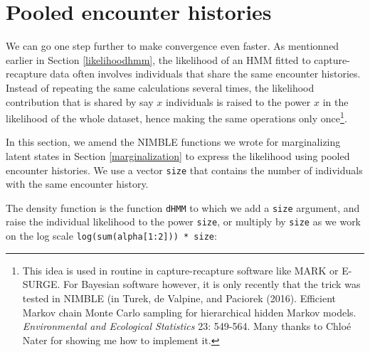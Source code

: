 \documentclass[
  12pt,
]{krantz}
\begin{document}
\hypertarget{pooled-likelihood}{%
\section{Pooled encounter histories}\label{pooled-likelihood}}

We can go one step further to make convergence even faster. As mentionned earlier in Section \ref{likelihoodhmm}, the likelihood of an HMM fitted to capture-recapture data often involves individuals that share the same encounter histories. Instead of repeating the same calculations several times, the likelihood contribution that is shared by say \(x\) individuals is raised to the power \(x\) in the likelihood of the whole dataset, hence making the same operations only once\footnote{This idea is used in routine in capture-recapture software like MARK or E-SURGE. For Bayesian software however, it is only recently that the trick was tested in NIMBLE (in Turek, de Valpine, and Paciorek (2016). Efficient Markov chain Monte Carlo sampling for hierarchical hidden Markov models. \emph{Environmental and Ecological Statistics} 23: 549-564. Many thanks to Chloé Nater for showing me how to implement it.}.

In this section, we amend the NIMBLE functions we wrote for marginalizing latent states in Section \ref{marginalization} to express the likelihood using pooled encounter histories. We use a vector \texttt{size} that contains the number of individuals with the same encounter history.

The density function is the function \texttt{dHMM} to which we add a \texttt{size} argument, and raise the individual likelihood to the power \texttt{size}, or multiply by \texttt{size} as we work on the log scale \texttt{log(sum(alpha{[}1:2{]}))\ *\ size}:
\end{document}

